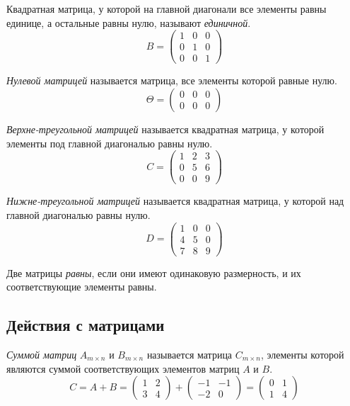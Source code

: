 \begin{definition}
  Квадратная матрица, у которой на главной диагонали все элементы равны единице, а остальные равны нулю, называют \textit{единичной}. \[
  B = \begin{pmatrix}
    1 & 0 & 0 \\
    0 & 1 & 0 \\
    0 & 0 & 1
  \end{pmatrix}
  \] 
\end{definition}

\begin{definition}
  \textit{Нулевой матрицей} называется матрица, все элементы которой равные нулю. \[
  \Theta = \begin{pmatrix}
    0 & 0 & 0 \\
    0 & 0 & 0
  \end{pmatrix}
  \] 
\end{definition}

\begin{definition}
  \textit{Верхне-треугольной матрицей} называется квадратная матрица, у которой элементы под главной диагональю равны нулю. \[
  C = \begin{pmatrix}
    1 & 2 & 3 \\
    0 & 5 & 6 \\
    0 & 0 & 9
  \end{pmatrix}
  \] 
\end{definition}

\begin{definition}
  \textit{Нижне-треугольной матрицей} называется квадратная матрица, у которой над главной диагональю равны нулю. \[
  D = \begin{pmatrix}
    1 & 0 & 0 \\
    4 & 5 & 0 \\
    7 & 8 & 9
  \end{pmatrix}
  \] 
\end{definition}

Две матрицы \textit{равны}, если они имеют одинаковую размерность, и их соответствующие элементы равны. 

\subsection{Действия с матрицами}

\begin{definition}
  \textit{Суммой матриц} $A_{m \times n}$ и $B_{m \times n}$ называется матрица $C_{m \times n}$, элементы которой являются суммой соответствующих элементов матриц $A$ и $B$. \[
  C = A + B = \begin{pmatrix}
    1 & 2 \\
    3 & 4
  \end{pmatrix}
  +
  \begin{pmatrix}
    -1 & -1 \\
    -2 & 0
  \end{pmatrix}
  =
  \begin{pmatrix}
    0 & 1 \\
    1 & 4
  \end{pmatrix}
  \] 
\end{definition}

